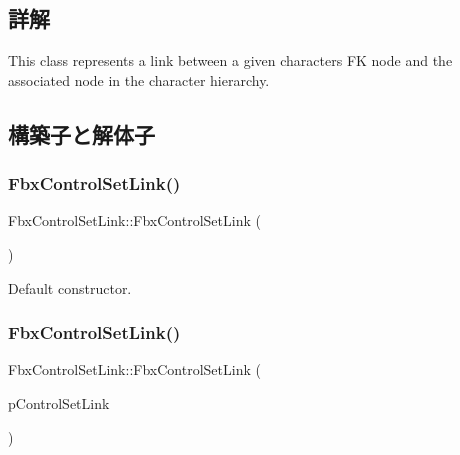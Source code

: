 \subsection{詳解}
This class represents a link between a given character\textquotesingle{}s FK node and the associated node in the character hierarchy. 

\subsection{構築子と解体子}
\mbox{\label{class_fbx_control_set_link_ae13e447eaf5a1f794b37d4a4f650377a}} 
\subsubsection{\texorpdfstring{Fbx\+Control\+Set\+Link()}{FbxControlSetLink()}\hspace{0.1cm}{\footnotesize\ttfamily [1/2]}}
{\footnotesize\ttfamily Fbx\+Control\+Set\+Link\+::\+Fbx\+Control\+Set\+Link (\begin{DoxyParamCaption}{ }\end{DoxyParamCaption})}



Default constructor. 

\mbox{\label{class_fbx_control_set_link_a9ecef760859353c34c59d180431ccfe6}} 
\subsubsection{\texorpdfstring{Fbx\+Control\+Set\+Link()}{FbxControlSetLink()}\hspace{0.1cm}{\footnotesize\ttfamily [2/2]}}
{\footnotesize\ttfamily Fbx\+Control\+Set\+Link\+::\+Fbx\+Control\+Set\+Link (\begin{DoxyParamCaption}\item[{const \hyperlink{class_fbx_control_set_link}{Fbx\+Control\+Set\+Link} \&}]{p\+Control\+Set\+Link }\end{DoxyParamCaption})}

